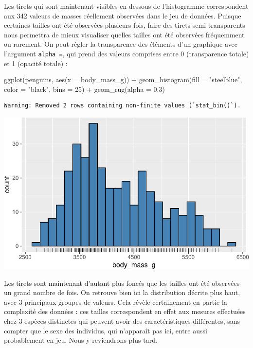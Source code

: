 \documentclass[
  a4paper,
  DIV=11,
  numbers=noendperiod,
  oneside]{scrreprt}
\newenvironment{Shaded}{}{}
\newcommand{\AttributeTok}[1]{\textcolor[rgb]{0.84,0.23,0.29}{#1}}
\newcommand{\DecValTok}[1]{\textcolor[rgb]{0.00,0.36,0.77}{#1}}
\newcommand{\FloatTok}[1]{\textcolor[rgb]{0.00,0.36,0.77}{#1}}
\newcommand{\FunctionTok}[1]{\textcolor[rgb]{0.44,0.26,0.76}{#1}}
\newcommand{\NormalTok}[1]{\textcolor[rgb]{0.14,0.16,0.18}{#1}}
\newcommand{\SpecialCharTok}[1]{\textcolor[rgb]{0.00,0.36,0.77}{#1}}
\newcommand{\StringTok}[1]{\textcolor[rgb]{0.01,0.18,0.38}{#1}}
\begin{document}
Les tirets qui sont maintenant visibles en-dessous de l'histogramme
correspondent aux 342 valeurs de masses réellement observées dans le jeu
de données. Puisque certaines tailles ont été observées plusieurs fois,
faire des tirets semi-transparents nous permettra de mieux visualiser
quelles tailles ont été observées fréquemment ou rarement. On peut
régler la transparence des éléments d'un graphique avec l'argument
\texttt{alpha\ =}, qui prend des valeurs comprises entre 0 (transparence
totale) et 1 (opacité totale) :

\begin{Shaded}
\begin{Highlighting}[]
\FunctionTok{ggplot}\NormalTok{(penguins, }\FunctionTok{aes}\NormalTok{(}\AttributeTok{x =}\NormalTok{ body\_mass\_g)) }\SpecialCharTok{+}
  \FunctionTok{geom\_histogram}\NormalTok{(}\AttributeTok{fill =} \StringTok{"steelblue"}\NormalTok{, }\AttributeTok{color =} \StringTok{"black"}\NormalTok{,}
                 \AttributeTok{bins =} \DecValTok{25}\NormalTok{) }\SpecialCharTok{+}
  \FunctionTok{geom\_rug}\NormalTok{(}\AttributeTok{alpha =} \FloatTok{0.3}\NormalTok{)}
\end{Highlighting}
\end{Shaded}

\begin{verbatim}
Warning: Removed 2 rows containing non-finite values (`stat_bin()`).
\end{verbatim}

\includegraphics{03-visualization_files/figure-pdf/unnamed-chunk-21-1.pdf}

Les tirets sont maintenant d'autant plus foncés que les tailles ont été
observées un grand nombre de fois. On retrouve bien ici la distribution
décrite plus haut, avec 3 principaux groupes de valeurs. Cela révèle
certainement en partie la complexité des données : ces tailles
correspondent en effet aux mesures effectuées chez 3 espèces distinctes
qui peuvent avoir des caractéristiques différentes, sans compter que le
sexe des individus, qui n'apparaît pas ici, entre aussi probablement en
jeu. Nous y reviendrons plus tard.
\end{document}
